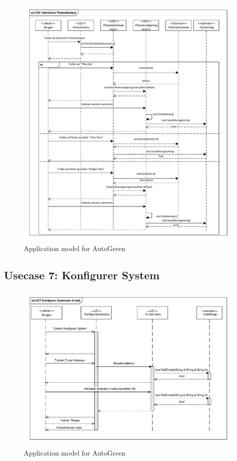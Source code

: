 \begin{figure}[!h]
\centering 
\includegraphics[width={\textwidth-1cm}, trim=0 0 0 0, clip=true] {../fig/SD_autogreen_UC_6_Adminstrer_Plantedatabase.pdf}
\caption{Application model for AutoGreen}
\label{fig:SD_UC6}
\end{figure}

\clearpage

\subsection{Usecase 7: Konfigurer System}

\begin{figure}[!h]
\centering 
\includegraphics[width={\textwidth-1cm}, trim=0 0 0 0, clip=true] {../fig/SD_autoGreen_UC_7_E_mail.pdf}
\caption{Application model for AutoGreen}
\label{fig:SD_UC7}
\end{figure}

